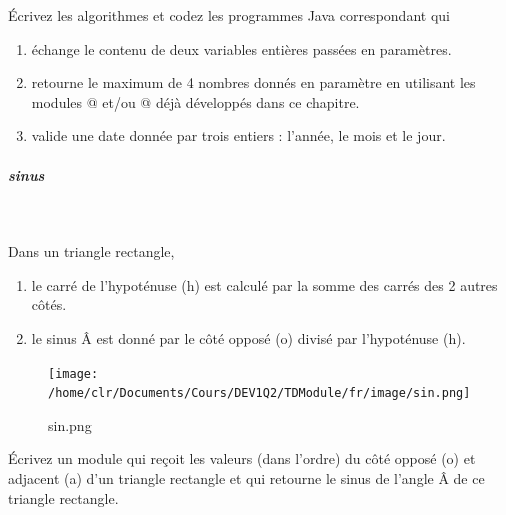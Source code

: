 \documentclass[11pt,a4paper]{article}
\begin{document}
            \par
        
        \'Ecrivez les algorithmes et codez les programmes Java correspondant qui 
          
					\begin{enumerate}
				
			\item \'echange le contenu de deux variables enti\`eres pass\'ees en param\`etres.
            
			\item retourne le maximum de 4 nombres donn\'es en param\`etre en utilisant 
              les modules @ et/ou @ d\'ej\`a d\'evelopp\'es dans ce chapitre.
			\item valide une date donn\'ee par trois entiers : l'ann\'ee, le mois et le jour.
					\end{enumerate}
				
            \par
        
			
		\subparagraph{sinus} 
		
					\textcolor{white}{.} \par
				
          Dans un triangle rectangle,
          
					\begin{enumerate}
				
			\item le carr\'e de l'hypot\'enuse (h) est calcul\'e par la somme des carr\'es des 2 autres c\^ot\'es.
			\item le sinus \^A est donn\'e par le c\^ot\'e oppos\'e (o) divis\'e par l'hypot\'enuse (h).
					\end{enumerate}
				\begin{figure}[hbt]
				    \begin{center}
					\texttt{[image: /home/clr/Documents/Cours/DEV1Q2/TDModule/fr/image/sin.png]}
						\end{center}
                
                    \caption[sin.png]{sin.png}
                \end{figure}
                    
            \par
        
          \'Ecrivez un module qui re\c coit les valeurs (dans l'ordre) du c\^ot\'e oppos\'e (o) et
          adjacent (a) d'un triangle rectangle et qui retourne le sinus de l'angle \^A de ce triangle rectangle.
        
            \par
        
				
\end{document}
